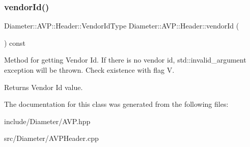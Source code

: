 \subsubsection{\texorpdfstring{vendor\+Id()}{vendorId()}}
{\footnotesize\ttfamily Diameter\+::\+A\+V\+P\+::\+Header\+::\+Vendor\+Id\+Type Diameter\+::\+A\+V\+P\+::\+Header\+::vendor\+Id (\begin{DoxyParamCaption}{ }\end{DoxyParamCaption}) const}



Method for getting Vendor Id. If there is no vendor id, std\+::invalid\+\_\+argument exception will be thrown. Check existence with flag {\ttfamily V}. 

\begin{DoxyReturn}{Returns}
Vendor Id value. 
\end{DoxyReturn}


The documentation for this class was generated from the following files\+:\begin{DoxyCompactItemize}
\item 
include/\+Diameter/A\+V\+P.\+hpp\item 
src/\+Diameter/A\+V\+P\+Header.\+cpp\end{DoxyCompactItemize}
